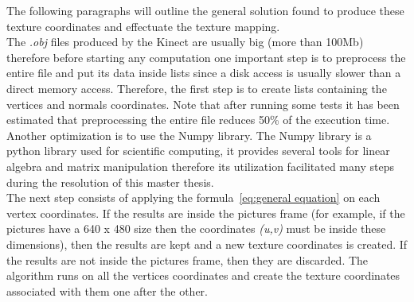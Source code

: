 The following paragraphs will outline the general solution found to produce these texture coordinates and effectuate the texture mapping.\\

The \textit{.obj} files produced by the Kinect are usually big (more than 100Mb) therefore before starting any computation one important step is to preprocess the entire file and put its data inside lists since a disk access is usually slower than a direct memory access. Therefore, the first step is to create lists containing the vertices and normals coordinates. Note that after running some tests it has been estimated that preprocessing the entire file reduces 50\% of the execution time.\\ 

Another optimization is to use the Numpy library. The Numpy library is a python library used for scientific computing, it provides several tools for linear algebra and matrix manipulation therefore its utilization facilitated many steps  during the resolution of this master thesis.\\

The next step consists of applying the formula~\ref{eq:general equation} on each vertex coordinates. If the results are inside the pictures frame (for example, if the pictures have a 640 x 480 size then the coordinates \textit{(u,v)} must be inside these dimensions), then the results are kept and a new texture coordinates is created. If the results are not inside the pictures frame, then they are discarded. The algorithm runs on all the vertices coordinates and create the texture coordinates associated with them one after the other.


